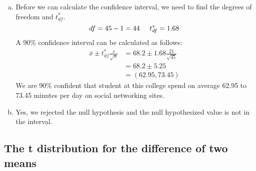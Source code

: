 {
{
\begin{enumerate}[(a)]
\setlength{\itemsep}{0mm}
\item Before we can calculate the confidence interval, we need to find the degrees of freedom and $t^*_{df}$.
\[ df = 45 - 1 = 44 \hspace{5mm} t^*_{df} = 1.68\]
A 90\% confidence interval can be calculated as follows:
\begin{align*}
\bar{x} \pm t^*_{df} \frac{s}{\sqrt{n}} &= 68.2 \pm 1.68\frac{21}{\sqrt{45}} \\
&= 68.2 \pm 5.25 \\
&= (62.95, 73.45)
\end{align*}
We are 90\% confident that student at this college spend on average 62.95 to 73.45 minutes per day on social networking sites.
\item Yes, we rejected the null hypothesis and the null hypothesized value is not in the interval.
\end{enumerate}
}}

%

\subsection{The t distribution for the difference of two means}

